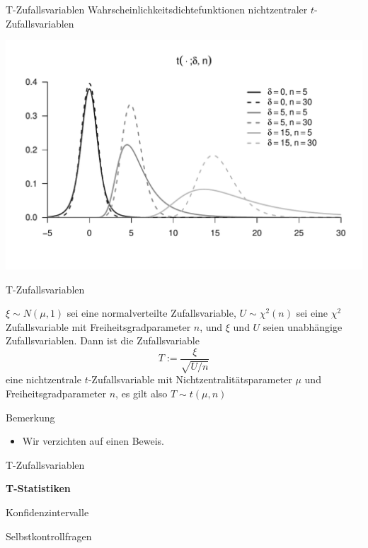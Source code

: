 \documentclass[
  8pt,
  ignorenonframetext,
]{beamer}
\providecommand{\tightlist}{%
  \setlength{\itemsep}{0pt}\setlength{\parskip}{0pt}}
\begin{document}
\begin{frame}{T-Zufallsvariablen}
\protect\hypertarget{t-zufallsvariablen-4}{}
Wahrscheinlichkeitsdichtefunktionen nichtzentraler
\(t\)-Zufallsvariablen \vspace{4mm}

\begin{center}\includegraphics[width=0.9\linewidth]{7_Abbildungen/alm_7_nichtzentrale_t_verteilung} \end{center}
\end{frame}

\begin{frame}{T-Zufallsvariablen}
\protect\hypertarget{t-zufallsvariablen-5}{}
\footnotesize
\begin{theorem}
\normalfont
\justifying
$\xi \sim N(\mu,1)$ sei eine normalverteilte Zufallsvariable, $U \sim \chi^2(n)$
sei eine $\chi^2$ Zufallsvariable mit Freiheitsgradparameter $n$, und $\xi$ und
$U$ seien unabhängige Zufallsvariablen. Dann ist die Zufallsvariable
\begin{equation}
T := \frac{\xi}{\sqrt{U/n}}
\end{equation}
eine nichtzentrale $t$-Zufallsvariable mit Nichtzentralitätsparameter $\mu$ und
Freiheitsgradparameter $n$, es gilt also $T \sim t(\mu,n)$
\end{theorem}

Bemerkung

\begin{itemize}
\tightlist
\item
  Wir verzichten auf einen Beweis.
\end{itemize}
\end{frame}

\begin{frame}{}
\protect\hypertarget{section-10}{}
\vfill
\large
{}

T-Zufallsvariablen

\textbf{T-Statistiken}

Konfidenzintervalle

Selbstkontrollfragen \vfill
\end{frame}
\end{document}
